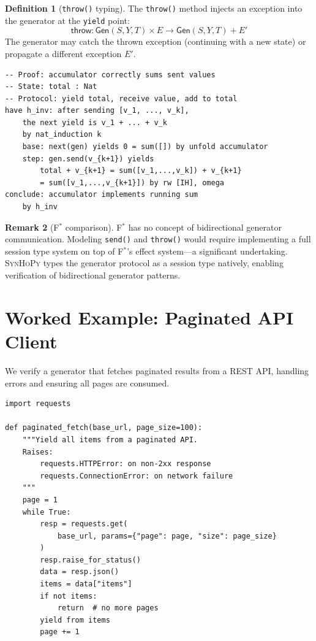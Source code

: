 \documentclass[11pt,a4paper]{report}
\theoremstyle{definition}
\newtheorem{definition}{Definition}[chapter]
\newtheorem{remark}[definition]{Remark}
\theoremstyle{plain}
\newcommand{\fstar}{F$^{*}$}
\newcommand{\synhopy}{\textsc{SynHoPy}}
\begin{document}
\begin{definition}[\texttt{throw()} typing]
The \texttt{throw()} method injects an exception into the generator at
the \texttt{yield} point:
\[
  \mathsf{throw} : \mathsf{Gen}(S, Y, T) \times E
    \to \mathsf{Gen}(S, Y, T) + E'
\]
The generator may catch the thrown exception (continuing with a new state)
or propagate a different exception $E'$.
\end{definition}

\begin{lstlisting}[style=proof]
-- Proof: accumulator correctly sums sent values
-- State: total : Nat
-- Protocol: yield total, receive value, add to total
have h_inv: after sending [v_1, ..., v_k],
    the next yield is v_1 + ... + v_k
    by nat_induction k
    base: next(gen) yields 0 = sum([]) by unfold accumulator
    step: gen.send(v_{k+1}) yields
        total + v_{k+1} = sum([v_1,...,v_k]) + v_{k+1}
        = sum([v_1,...,v_{k+1}]) by rw [IH], omega
conclude: accumulator implements running sum
    by h_inv
\end{lstlisting}

\begin{remark}[\fstar{} comparison]
\fstar{} has no concept of bidirectional generator communication.
Modeling \texttt{send()} and \texttt{throw()} would require implementing
a full session type system on top of \fstar{}'s effect system---a significant
undertaking.  \synhopy{} types the generator protocol as a session type
natively, enabling verification of bidirectional generator patterns.
\end{remark}

\section{Worked Example: Paginated API Client}

We verify a generator that fetches paginated results from a REST API,
handling errors and ensuring all pages are consumed.

\begin{lstlisting}[style=python]
import requests

def paginated_fetch(base_url, page_size=100):
    """Yield all items from a paginated API.
    Raises:
        requests.HTTPError: on non-2xx response
        requests.ConnectionError: on network failure
    """
    page = 1
    while True:
        resp = requests.get(
            base_url, params={"page": page, "size": page_size}
        )
        resp.raise_for_status()
        data = resp.json()
        items = data["items"]
        if not items:
            return  # no more pages
        yield from items
        page += 1
\end{lstlisting}
\end{document}
